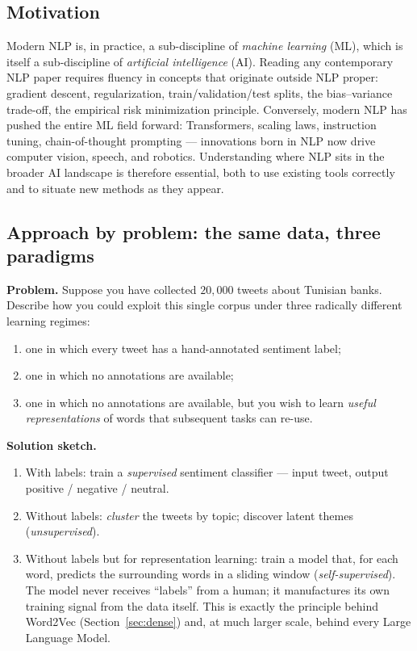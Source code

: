 \subsection{Motivation}
Modern NLP is, in practice, a sub-discipline of \emph{machine learning} (ML), which is itself a sub-discipline of \emph{artificial intelligence} (AI). Reading any contemporary NLP paper requires fluency in concepts that originate outside NLP proper: gradient descent, regularization, train/validation/test splits, the bias--variance trade-off, the empirical risk minimization principle. Conversely, modern NLP has pushed the entire ML field forward: Transformers, scaling laws, instruction tuning, chain-of-thought prompting --- innovations born in NLP now drive computer vision, speech, and robotics. Understanding where NLP sits in the broader AI landscape is therefore essential, both to use existing tools correctly and to situate new methods as they appear.

\subsection{Approach by problem: the same data, three paradigms}
\textbf{Problem.} Suppose you have collected $20{,}000$ tweets about Tunisian banks. Describe how you could exploit this single corpus under three radically different learning regimes:
\begin{enumerate}
    \item one in which every tweet has a hand-annotated sentiment label;
    \item one in which no annotations are available;
    \item one in which no annotations are available, but you wish to learn \emph{useful representations} of words that subsequent tasks can re-use.
\end{enumerate}

\textbf{Solution sketch.}
\begin{enumerate}
    \item With labels: train a \emph{supervised} sentiment classifier --- input tweet, output positive / negative / neutral.
    \item Without labels: \emph{cluster} the tweets by topic; discover latent themes (\emph{unsupervised}).
    \item Without labels but for representation learning: train a model that, for each word, predicts the surrounding words in a sliding window (\emph{self-supervised}). The model never receives ``labels'' from a human; it manufactures its own training signal from the data itself. This is exactly the principle behind Word2Vec (Section~\ref{sec:dense}) and, at much larger scale, behind every Large Language Model.
\end{enumerate}


